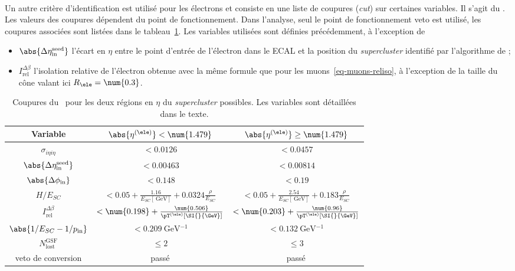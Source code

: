 \paragraph{\CutBasedEleID}
Un autre critère d'identification est utilisé pour les électrons et consiste en une liste de coupures (\emph{cut}) sur certaines variables.
Il s'agit du \CutBasedEleID.
Les valeurs des coupures dépendent du point de fonctionnement.
Dans l'analyse, seul le point de fonctionnement \og veto \fg{} est utilisé, les coupures associées sont listées dans le tableau~\ref{tab-CutBasedEleIDVeto}.
Les variables utilisées sont définies précédemment, à l'exception de
\begin{itemize}
\item $\abs{\Delta\eta_\text{in}^\text{seed}}$ l'écart en $\eta$ entre le point d'entrée de l'électron dans le ECAL et la position du \emph{supercluster} identifié par l'algorithme de \PF;
\item $I_\text{rel}^{\Delta\beta}$ l'isolation relative de l'électron obtenue avec la même formule que pour les muons~\eqref{eq-muons-reliso}, à l'exception de la taille du cône valant ici $R_{\ele}=\num{0.3}$.
\end{itemize}
\begin{table}[h]
\centering
\begin{tabular}{ccc}
\toprule
Variable & $\abs{\eta^{(\ele)}} < \num{1.479}$ & $\abs{\eta^{(\ele)}} \geq \num{1.479}$ \\
\midrule
$\sigma_{i\eta i\eta}$ & $<\num{0.0126}$ & $<\num{0.0457}$ \\
$\abs{\Delta\eta_\text{in}^\text{seed}}$ & $<\num{0.00463}$ & $<\num{0.00814}$ \\
$\abs{\Delta\phi_\text{in}}$ & $<\num{0.148}$ & $<\num{0.19}$ \\
$H/E_{SC}$ & $<\num{0.05}+\frac{\num{1.16}}{E_{SC} [\SI{}{\GeV}]} + \num{0.0324}\frac{\rho}{E_{SC}}$ & $<\num{0.05}+\frac{\num{2.54}}{E_{SC} [\SI{}{\GeV}]} + \num{0.183}\frac{\rho}{E_{SC}}$ \\
$I_\text{rel}^{\Delta\beta}$ & $<\num{0.198} + \frac{\num{0.506}}{\pT^{(\ele)} [\SI{}{\GeV}]}$ & $<\num{0.203} + \frac{\num{0.96}}{\pT^{(\ele)} [\SI{}{\GeV}]}$ \\
$\abs{1/E_{SC}-1/p_\text{in}}$ & $<\SI{0.209}{\GeV^{-1}}$ & $<\SI{0.132}{\GeV^{-1}}$ \\
$N_\text{lost}^\text{GSF}$ & $\leq\num{2}$ & $\leq\num{3}$ \\
veto de conversion & passé & passé \\
\bottomrule
\end{tabular}
\caption[Coupures du \CutBasedEleIDVeto.]{Coupures du \CutBasedEleIDVeto\ pour les deux régions en $\eta$ du \emph{supercluster} possibles. Les variables sont détaillées dans le texte.}
\label{tab-CutBasedEleIDVeto}
\end{table}

